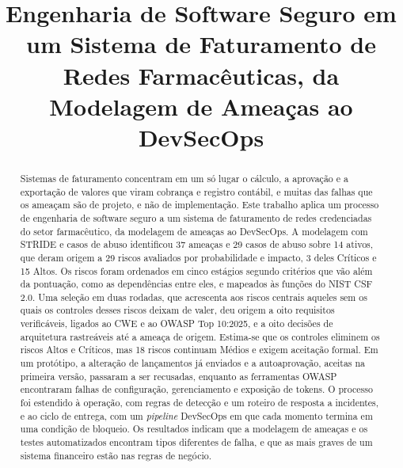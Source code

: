\documentclass[conference]{IEEEtran}
\begin{document}
\title{Engenharia de Software Seguro em um Sistema de Faturamento de Redes Farmacêuticas, da Modelagem de Ameaças ao DevSecOps}

\author{
}

\maketitle

\begin{abstract}
Sistemas de faturamento concentram em um só lugar o cálculo, a aprovação e a exportação de valores que viram cobrança e registro contábil, e muitas das falhas que os ameaçam são de projeto, e não de implementação. Este trabalho aplica um processo de engenharia de software seguro a um sistema de faturamento de redes credenciadas do setor farmacêutico, da modelagem de ameaças ao DevSecOps. A modelagem com STRIDE e casos de abuso identificou 37 ameaças e 29 casos de abuso sobre 14 ativos, que deram origem a 29 riscos avaliados por probabilidade e impacto, 3 deles Críticos e 15 Altos. Os riscos foram ordenados em cinco estágios segundo critérios que vão além da pontuação, como as dependências entre eles, e mapeados às funções do NIST CSF 2.0. Uma seleção em duas rodadas, que acrescenta aos riscos centrais aqueles sem os quais os controles desses riscos deixam de valer, deu origem a oito requisitos verificáveis, ligados ao CWE e ao OWASP Top 10:2025, e a oito decisões de arquitetura rastreáveis até a ameaça de origem. Estima-se que os controles eliminem os riscos Altos e Críticos, mas 18 riscos continuam Médios e exigem aceitação formal. Em um protótipo, a alteração de lançamentos já enviados e a autoaprovação, aceitas na primeira versão, passaram a ser recusadas, enquanto as ferramentas OWASP encontraram falhas de configuração, gerenciamento e exposição de tokens. O processo foi estendido à operação, com regras de detecção e um roteiro de resposta a incidentes, e ao ciclo de entrega, com um \textit{pipeline} DevSecOps em que cada momento termina em uma condição de bloqueio. Os resultados indicam que a modelagem de ameaças e os testes automatizados encontram tipos diferentes de falha, e que as mais graves de um sistema financeiro estão nas regras de negócio.
\end{abstract}
\end{document}
